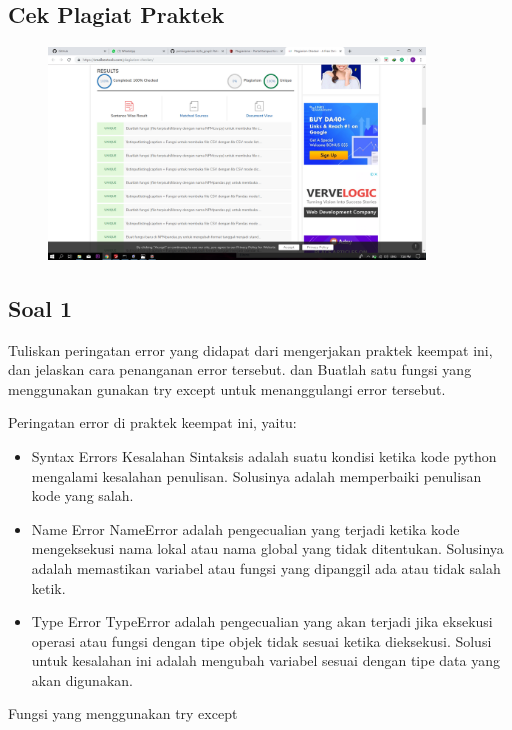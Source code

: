 \subsection{Cek Plagiat Praktek}
\begin{figure}[H]
	\includegraphics[width=10cm]{figures/4/1174026/Praktek/plagiatketerampilan.png}
	\centering
\end{figure}

\subsection{Soal 1}
Tuliskan  peringatan  error  yang  didapat  dari  mengerjakan  praktek  keempat  ini, dan  jelaskan  cara  penanganan  error  tersebut.   dan  Buatlah  satu  fungsi  yang menggunakan gunakan try except untuk menanggulangi error tersebut.

Peringatan error di praktek keempat ini, yaitu:
\begin{itemize}
	\item Syntax Errors
	Kesalahan Sintaksis adalah suatu kondisi ketika kode python mengalami kesalahan penulisan. Solusinya adalah memperbaiki penulisan kode yang salah.
	
	\item Name Error
	NameError adalah pengecualian yang terjadi ketika kode mengeksekusi nama lokal atau nama global yang tidak ditentukan. Solusinya adalah memastikan variabel atau fungsi yang dipanggil ada atau tidak salah ketik.
	
	\item Type Error
	TypeError adalah pengecualian yang akan terjadi jika eksekusi operasi atau fungsi dengan tipe objek tidak sesuai ketika dieksekusi. Solusi untuk kesalahan ini adalah mengubah variabel sesuai dengan tipe data yang akan digunakan.
\end{itemize}

Fungsi yang menggunakan try except


